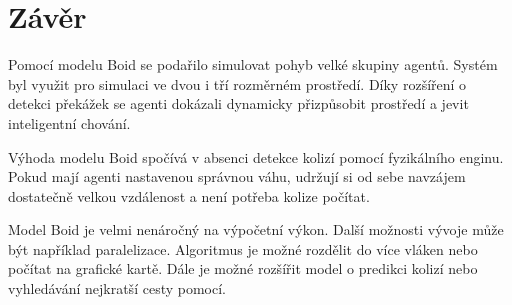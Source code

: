 \section{Závěr}
Pomocí modelu Boid se podařilo simulovat pohyb velké skupiny agentů. Systém byl využit pro simulaci ve dvou i tří rozměrném prostředí. Díky rozšíření o detekci překážek se agenti dokázali dynamicky přizpůsobit prostředí a jevit inteligentní chování. 
\par
Výhoda modelu Boid spočívá v absenci detekce kolizí pomocí fyzikálního enginu. Pokud mají agenti nastavenou správnou váhu, udržují si od sebe navzájem dostatečně velkou vzdálenost a není potřeba kolize počítat. 
\par
Model Boid je velmi nenáročný na výpočetní výkon. Další možnosti vývoje může být například paralelizace. Algoritmus je možné rozdělit do více vláken nebo počítat na grafické kartě. Dále je možné rozšířit model o predikci kolizí \cite{Golas2013} nebo vyhledávání nejkratší cesty pomocí. 